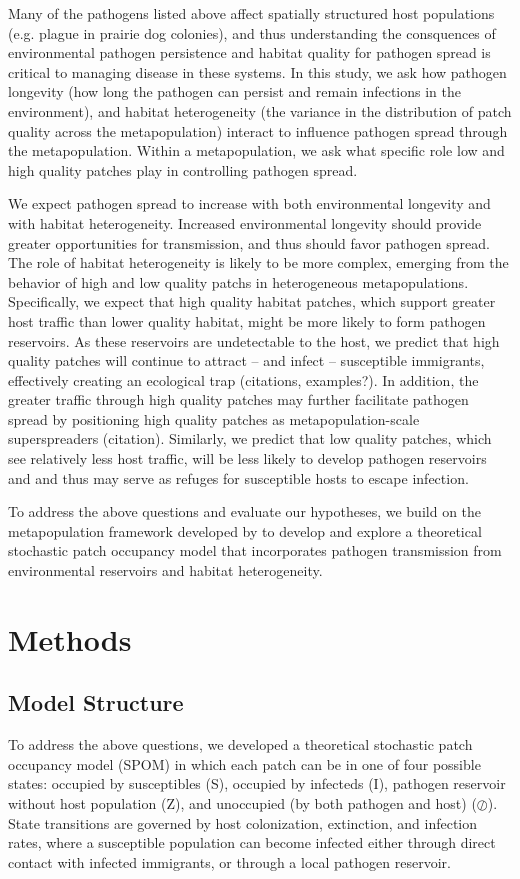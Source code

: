 \documentclass{svjour3}
\begin{document}
Many of the pathogens listed above affect spatially structured host populations (e.g. plague in prairie dog colonies), and thus understanding the consquences of environmental pathogen persistence and habitat quality for pathogen spread is critical to managing disease in these systems.  In this study, we ask how pathogen longevity (how long the pathogen can persist and remain infections in the environment), and habitat heterogeneity (the variance in the distribution of patch quality across the metapopulation) interact to influence pathogen spread through the metapopulation.  Within a metapopulation, we ask what specific role low and high quality patches play in controlling pathogen spread.  

We expect pathogen spread to increase with both environmental longevity and with habitat heterogeneity.  Increased environmental longevity should provide greater opportunities for transmission, and thus should favor pathogen spread.  The role of habitat heterogeneity is likely to be more complex, emerging from the behavior of high and low quality patchs in heterogeneous metapopulations.  Specifically, we expect that high quality habitat patches, which support greater host traffic than lower quality habitat, might be more likely to form pathogen reservoirs.  As these reservoirs are undetectable to the host, we predict that high quality patches will continue to attract -- and infect -- susceptible immigrants, effectively creating an ecological trap (citations, examples?).  In addition, the greater traffic through high quality patches may further facilitate pathogen spread by positioning high quality patches as metapopulation-scale superspreaders (citation).  Similarly, we predict that low quality patches, which see relatively less host traffic, will be less likely to develop pathogen reservoirs and and thus may serve as refuges for susceptible hosts to escape infection.  

To address the above questions and evaluate our hypotheses, we build on the metapopulation framework developed by \cite{Hanski1994} to develop and explore a theoretical stochastic patch occupancy model that incorporates pathogen transmission from environmental reservoirs and habitat heterogeneity.   

\section{Methods}
\label{methods}

\subsection{Model Structure}
To address the above questions, we developed a theoretical stochastic patch occupancy model (SPOM) in which each patch can be in one of four possible states: occupied by susceptibles (S), occupied by infecteds (I), pathogen reservoir without host population (Z), and unoccupied (by both pathogen and host) ($\oslash$).  State transitions are governed by host colonization, extinction, and infection rates, where a susceptible population can become infected either through direct contact with infected immigrants, or through a local pathogen reservoir.  
\end{document}
